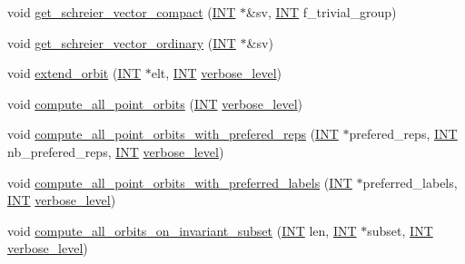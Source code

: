 \begin{DoxyCompactItemize}
\item 
void \mbox{\hyperlink{classschreier_acea7499a4f501c208e22bfd2aacabc90}{get\+\_\+schreier\+\_\+vector\+\_\+compact}} (\mbox{\hyperlink{galois_8h_a09fddde158a3a20bd2dcadb609de11dc}{I\+NT}} $\ast$\&sv, \mbox{\hyperlink{galois_8h_a09fddde158a3a20bd2dcadb609de11dc}{I\+NT}} f\+\_\+trivial\+\_\+group)
\item 
void \mbox{\hyperlink{classschreier_ae08fe34b58703c0e4f2039b4f839c3ca}{get\+\_\+schreier\+\_\+vector\+\_\+ordinary}} (\mbox{\hyperlink{galois_8h_a09fddde158a3a20bd2dcadb609de11dc}{I\+NT}} $\ast$\&sv)
\item 
void \mbox{\hyperlink{classschreier_aa466ebd594d89c13454cd4be50bb3a8f}{extend\+\_\+orbit}} (\mbox{\hyperlink{galois_8h_a09fddde158a3a20bd2dcadb609de11dc}{I\+NT}} $\ast$elt, \mbox{\hyperlink{galois_8h_a09fddde158a3a20bd2dcadb609de11dc}{I\+NT}} \mbox{\hyperlink{simeon_8_c_a818073fbcc2f439e7c56952f67386122}{verbose\+\_\+level}})
\item 
void \mbox{\hyperlink{classschreier_a1deec048f51f380bc3476d4cd4d95e94}{compute\+\_\+all\+\_\+point\+\_\+orbits}} (\mbox{\hyperlink{galois_8h_a09fddde158a3a20bd2dcadb609de11dc}{I\+NT}} \mbox{\hyperlink{simeon_8_c_a818073fbcc2f439e7c56952f67386122}{verbose\+\_\+level}})
\item 
void \mbox{\hyperlink{classschreier_a3669602ae33fc6fcd516b13ac32cf152}{compute\+\_\+all\+\_\+point\+\_\+orbits\+\_\+with\+\_\+prefered\+\_\+reps}} (\mbox{\hyperlink{galois_8h_a09fddde158a3a20bd2dcadb609de11dc}{I\+NT}} $\ast$prefered\+\_\+reps, \mbox{\hyperlink{galois_8h_a09fddde158a3a20bd2dcadb609de11dc}{I\+NT}} nb\+\_\+prefered\+\_\+reps, \mbox{\hyperlink{galois_8h_a09fddde158a3a20bd2dcadb609de11dc}{I\+NT}} \mbox{\hyperlink{simeon_8_c_a818073fbcc2f439e7c56952f67386122}{verbose\+\_\+level}})
\item 
void \mbox{\hyperlink{classschreier_ab607b80f0184cd504f62d5c6852fb3d0}{compute\+\_\+all\+\_\+point\+\_\+orbits\+\_\+with\+\_\+preferred\+\_\+labels}} (\mbox{\hyperlink{galois_8h_a09fddde158a3a20bd2dcadb609de11dc}{I\+NT}} $\ast$preferred\+\_\+labels, \mbox{\hyperlink{galois_8h_a09fddde158a3a20bd2dcadb609de11dc}{I\+NT}} \mbox{\hyperlink{simeon_8_c_a818073fbcc2f439e7c56952f67386122}{verbose\+\_\+level}})
\item 
void \mbox{\hyperlink{classschreier_ab5d7df97773f59ded1e98ba1abfa957c}{compute\+\_\+all\+\_\+orbits\+\_\+on\+\_\+invariant\+\_\+subset}} (\mbox{\hyperlink{galois_8h_a09fddde158a3a20bd2dcadb609de11dc}{I\+NT}} len, \mbox{\hyperlink{galois_8h_a09fddde158a3a20bd2dcadb609de11dc}{I\+NT}} $\ast$subset, \mbox{\hyperlink{galois_8h_a09fddde158a3a20bd2dcadb609de11dc}{I\+NT}} \mbox{\hyperlink{simeon_8_c_a818073fbcc2f439e7c56952f67386122}{verbose\+\_\+level}})

\end{DoxyCompactItemize}
